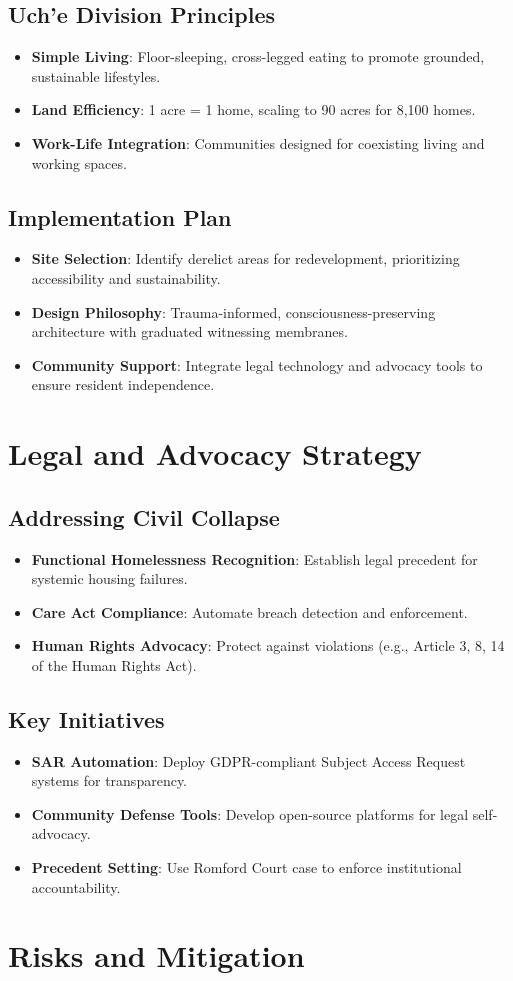 \documentclass[12pt]{article}\usepackage[a4paper,margin=1in]{geometry}
\begin{document}
\subsection*{Uch'e Division Principles}
\begin{itemize}
    \item \textbf{Simple Living}: Floor-sleeping, cross-legged eating to promote grounded, sustainable lifestyles.
    \item \textbf{Land Efficiency}: 1 acre = 1 home, scaling to 90 acres for 8,100 homes.
    \item \textbf{Work-Life Integration}: Communities designed for coexisting living and working spaces.
\end{itemize}\subsection*{Implementation Plan}
\begin{itemize}
    \item \textbf{Site Selection}: Identify derelict areas for redevelopment, prioritizing accessibility and sustainability.
    \item \textbf{Design Philosophy}: Trauma-informed, consciousness-preserving architecture with graduated witnessing membranes.
    \item \textbf{Community Support}: Integrate legal technology and advocacy tools to ensure resident independence.
\end{itemize}\section*{Legal and Advocacy Strategy}
\subsection*{Addressing Civil Collapse}
\begin{itemize}
    \item \textbf{Functional Homelessness Recognition}: Establish legal precedent for systemic housing failures.
    \item \textbf{Care Act Compliance}: Automate breach detection and enforcement.
    \item \textbf{Human Rights Advocacy}: Protect against violations (e.g., Article 3, 8, 14 of the Human Rights Act).
\end{itemize}\subsection*{Key Initiatives}
\begin{itemize}
    \item \textbf{SAR Automation}: Deploy GDPR-compliant Subject Access Request systems for transparency.
    \item \textbf{Community Defense Tools}: Develop open-source platforms for legal self-advocacy.
    \item \textbf{Precedent Setting}: Use Romford Court case to enforce institutional accountability.
\end{itemize}\section*{Risks and Mitigation}
\end{document}
